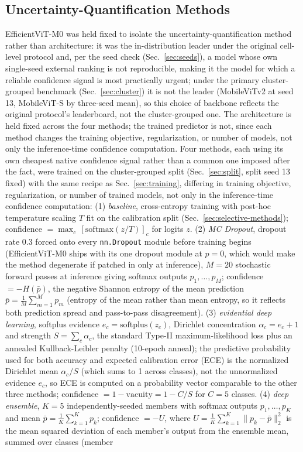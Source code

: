 \documentclass[12pt,letterpaper]{article}
\begin{document}
\subsection{Uncertainty-Quantification Methods}
\label{sec:uq-methods}
EfficientViT-M0 was held fixed to isolate the uncertainty-quantification method rather than architecture: it was the in-distribution leader under the original cell-level protocol and, per the seed check (Sec.~\ref{sec:seeds}), a model whose own single-seed external ranking is not reproducible, making it the model for which a reliable confidence signal is most practically urgent; under the primary cluster-grouped benchmark (Sec.~\ref{sec:cluster}) it is not the leader (MobileViTv2 at seed 13, MobileViT-S by three-seed mean), so this choice of backbone reflects the original protocol's leaderboard, not the cluster-grouped one. The architecture is held fixed across the four methods; the trained predictor is not, since each method changes the training objective, regularization, or number of models, not only the inference-time confidence computation. Four methods, each using its own cheapest native confidence signal rather than a common one imposed after the fact, were trained on the cluster-grouped split (Sec.~\ref{sec:split}, split seed 13 fixed) with the same recipe as Sec.~\ref{sec:training}, differing in training objective, regularization, or number of trained models, not only in the inference-time confidence computation: (1) \emph{baseline}, cross-entropy training with post-hoc temperature scaling $T$ fit on the calibration split (Sec.~\ref{sec:selective-methods}); confidence $=\max_c\,[\mathrm{softmax}(z/T)]_c$ for logits $z$. (2) \emph{MC Dropout},\cite{gal2016dropout} dropout rate 0.3 forced onto every \texttt{nn.Dropout} module before training begins (EfficientViT-M0 ships with its one dropout module at $p=0$, which would make the method degenerate if patched in only at inference), $M=20$ stochastic forward passes at inference giving softmax outputs $p_1,\ldots,p_M$; confidence $=-H(\bar p)$, the negative Shannon entropy of the mean prediction $\bar p = \frac{1}{M}\sum_{m=1}^{M} p_m$ (entropy of the mean rather than mean entropy, so it reflects both prediction spread and pass-to-pass disagreement). (3) \emph{evidential deep learning},\cite{sensoy2018evidential} softplus evidence $e_c=\mathrm{softplus}(z_c)$, Dirichlet concentration $\alpha_c=e_c+1$ and strength $S=\sum_c \alpha_c$, the standard Type-II maximum-likelihood loss plus an annealed Kullback-Leibler penalty (10-epoch anneal); the predictive probability used for both accuracy and expected calibration error (ECE) is the normalized Dirichlet mean $\alpha_c/S$ (which sums to 1 across classes), not the unnormalized evidence $e_c$, so ECE is computed on a probability vector comparable to the other three methods; confidence $=1-\mathrm{vacuity}=1-C/S$ for $C=5$ classes. (4) \emph{deep ensemble},\cite{lakshminarayanan2017ensembles} $K=5$ independently-seeded members with softmax outputs $p_1,\ldots,p_K$ and mean $\bar p = \frac{1}{K}\sum_{k=1}^{K}p_k$; confidence $=-U$, where $U=\frac{1}{K}\sum_{k=1}^{K}\lVert p_k-\bar p\rVert_2^2$ is the mean squared deviation of each member's output from the ensemble mean, summed over classes (member 
\end{document}

